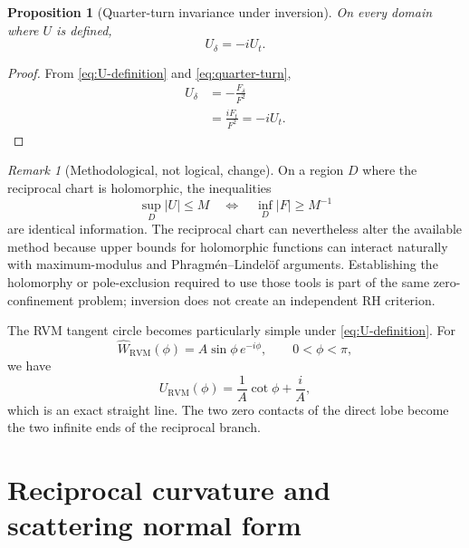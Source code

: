 \documentclass[11pt]{amsart}
\numberwithin{equation}{section}
\newtheorem{proposition}[theorem]{Proposition}
\theoremstyle{definition}
\theoremstyle{remark}
\newtheorem{remark}[theorem]{Remark}
\begin{document}
\begin{proposition}[Quarter-turn invariance under inversion]
\label{prop:U-quarter-turn}
On every domain where $U$ is defined,
\begin{equation}
U_\delta=-iU_t.
\label{eq:U-quarter-turn}
\end{equation}
\end{proposition}

\begin{proof}
From \eqref{eq:U-definition} and \eqref{eq:quarter-turn},
\begin{align}
U_\delta
&=-\frac{F_\delta}{F^2}
\label{eq:Udelta-step}\\
&=\frac{iF_t}{F^2}
=-iU_t.
\label{eq:Udelta-final}
\end{align}
\end{proof}

\begin{remark}[Methodological, not logical, change]
\label{rem:reciprocal-method}
On a region $D$ where the reciprocal chart is holomorphic, the inequalities
\begin{equation}
\sup_D|U|\le M
\quad\Longleftrightarrow\quad
\inf_D|F|\ge M^{-1}
\label{eq:upper-lower-equivalence}
\end{equation}
are identical information.  The reciprocal chart can nevertheless alter the available method because upper bounds for holomorphic functions can interact naturally with maximum-modulus and Phragmén--Lindelöf arguments.  Establishing the holomorphy or pole-exclusion required to use those tools is part of the same zero-confinement problem; inversion does not create an independent RH criterion.
\end{remark}

The RVM tangent circle becomes particularly simple under \eqref{eq:U-definition}.  For
\begin{equation}
\widehat W_{\mathrm{RVM}}(\phi)=A\sin\phi\,e^{-i\phi},
\qquad 0<\phi<\pi,
\label{eq:RVM-direct-phi}
\end{equation}
we have
\begin{equation}
U_{\mathrm{RVM}}(\phi)=\frac1A\cot\phi+\frac{i}{A},
\label{eq:RVM-inverse-line}
\end{equation}
which is an exact straight line.  The two zero contacts of the direct lobe become the two infinite ends of the reciprocal branch.

\section{Reciprocal curvature and scattering normal form}
\label{sec:reciprocal-scattering}
\end{document}
